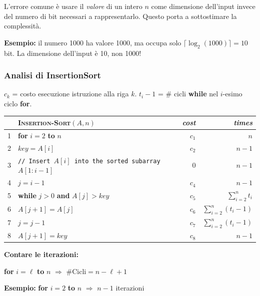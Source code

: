 \documentclass[a4paper, 11pt]{article}
\theoremstyle{definition}
\theoremstyle{remark}
\theoremstyle{remark}
\newenvironment{nota}{%
	\begin{tcolorbox}[
		colback=codebg,
		colframe=primary,
		fonttitle=\bfseries,
		title=Nota,
		left=6pt, right=6pt, top=4pt, bottom=4pt
		]
	}{%
	\end{tcolorbox}
}
\begin{document}
	\begin{nota}
		L'errore comune è usare il \emph{valore} di un intero $n$ come
		dimensione dell'input invece del numero di bit necessari a
		rappresentarlo. Questo porta a sottostimare la complessità.
		
		\textbf{Esempio:} il numero 1000 ha valore 1000, ma occupa solo $\lceil \log_2(1000) \rceil = 10$ bit. La dimensione dell'input è 10, non 1000!
	\end{nota}
	
	\subsubsection*{Analisi di InsertionSort}
	
	$c_k$ = costo esecuzione istruzione alla riga $k$. \quad
	$t_i - 1$ = \# cicli \textbf{while} nel $i$-esimo ciclo \textbf{for}.
	
	\begin{center}
		\begin{tabular}{rll r r}
			\toprule
			& \textsc{Insertion-Sort}$(A, n)$ & & \textit{cost} & \textit{times} \\
			\midrule
			1 & \textbf{for} $i = 2$ \textbf{to} $n$ & & $c_1$ & $n$ \\
			2 & \quad $key = A[i]$ & & $c_2$ & $n-1$ \\
			3 & \quad \textcolor{codegreen}{\texttt{// Insert $A[i]$ into the sorted subarray $A[1:i-1]$}} & & $0$ & $n-1$ \\
			4 & \quad $j = i - 1$ & & $c_4$ & $n-1$ \\
			5 & \quad \textbf{while} $j > 0$ \textbf{and} $A[j] > key$ & & $c_5$ & $\displaystyle\sum_{i=2}^{n} t_i$ \\[6pt]
			6 & \qquad $A[j+1] = A[j]$ & & $c_6$ & $\displaystyle\sum_{i=2}^{n} (t_i - 1)$ \\[6pt]
			7 & \qquad $j = j - 1$ & & $c_7$ & $\displaystyle\sum_{i=2}^{n} (t_i - 1)$ \\[6pt]
			8 & \quad $A[j+1] = key$ & & $c_8$ & $n-1$ \\
			\bottomrule
		\end{tabular}
	\end{center}
	
	\begin{softnote}
		\textbf{Contare le iterazioni:}
		
		\textbf{for} $i = \ell$ \textbf{to} $n$ \quad $\Rightarrow$ \quad $\#\text{Cicli} = n - \ell + 1$
		
		\textbf{Esempio:} \textbf{for} $i = 2$ \textbf{to} $n$ \quad $\Rightarrow$ \quad $n - 1$ iterazioni
	\end{softnote}
	
\end{document}
